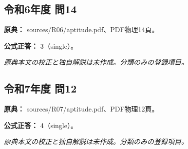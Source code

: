 \subsection{令和6年度 問14}
\label{q:r06-reg-apt-14}

\noindent\textbf{原典：} sources/R06/aptitude.pdf、PDF物理14頁。

\textbf{公式正答：} 3（single）。

\par\textit{原典本文の校正と独自解説は未作成。分類のみの登録項目。}

\subsection{令和7年度 問12}
\label{q:r07-reg-apt-12}

\noindent\textbf{原典：} sources/R07/aptitude.pdf、PDF物理12頁。

\textbf{公式正答：} 4（single）。

\par\textit{原典本文の校正と独自解説は未作成。分類のみの登録項目。}
